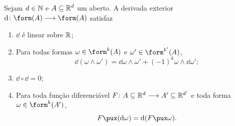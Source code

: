 \begin{prop}
Sejam $d \in \mathbb{N}$ e $A \subseteq \mathbb{R}^d$ um aberto. A derivada exterior $\dd\colon \form (A) \to \form (A)$ satisfaz
	\begin{enumerate}
	\item $\dd$ é linear sobre $\mathbb{R}$;
	\item  Para todas formas $\omega \in \form^k (A)$ e $\omega' \in \form^{k'} (A)$,
		\begin{equation*}
		\dd(\omega \wedge \omega') = \dd\omega \wedge \omega' + (-1)^k\omega \wedge \dd \omega';
		\end{equation*}
	\item $\dd \circ \dd = 0$;
	\item Para toda função diferenciável $F\colon A \subseteq \mathbb{R}^d \longrightarrow A' \subseteq \mathbb{R}^{d'}$ e toda forma $\omega \in \form^k(A')$,
		\begin{equation*}
		F\pux(\dd\omega) = \dd (F\pux\omega).
		\end{equation*}
	\end{enumerate}
\end{prop}
